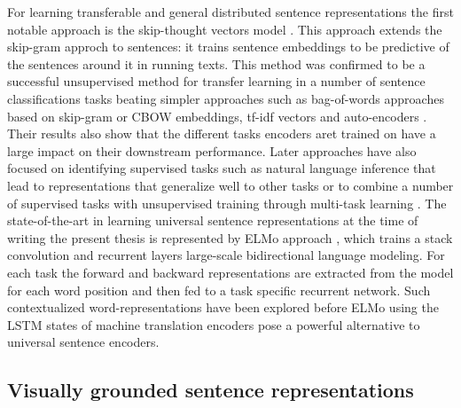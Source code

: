 For learning transferable and general distributed sentence representations the first notable approach is the
skip-thought vectors model \cite{kiros2015skip}. This approach extends the skip-gram approch to sentences: it
trains sentence embeddings to be predictive of the sentences around it in running texts.
This method was confirmed to be a successful unsupervised method for transfer learning in a number of sentence
classifications tasks beating simpler approaches such as bag-of-words approaches based on skip-gram or CBOW embeddings,
tf-idf vectors and auto-encoders \cite{hill2016learning}. Their results also show that the different tasks encoders
aret trained on have a large impact on their downstream performance.
Later approaches have also focused on identifying supervised tasks such as natural language inference
 \cite{conneau-EtAl:2017:EMNLP2017} that lead to representations that generalize well to other tasks or to combine a
 number of supervised tasks with unsupervised training through multi-task learning \cite{subramanian2018learning}.
 The state-of-the-art in learning universal sentence representations at the time of writing the present thesis is
 represented by ELMo approach \cite{peters2018deep}, which trains a stack convolution and recurrent layers large-scale
 bidirectional language modeling. For each task the forward and backward representations are extracted from the model for each word position and then fed to a task specific recurrent network. Such contextualized word-representations have been explored before ELMo using the LSTM states of machine translation encoders \cite{mccann2017learned} pose a powerful alternative to universal sentence encoders.

\subsection{Visually grounded sentence representations}
\label{sec:visualsentences}

